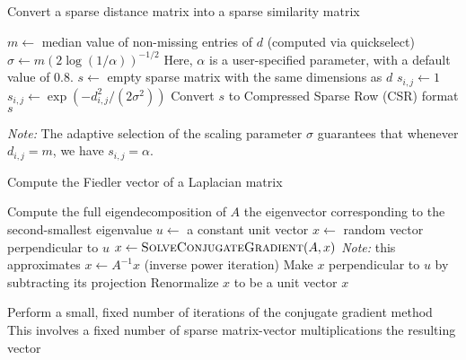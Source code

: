 \documentclass[11pt]{article}
\begin{document}
\begin{algorithm}
\caption{Convert a sparse distance matrix into a sparse similarity matrix}
\begin{algorithmic}
  \State $m \gets $ median value of non-missing entries of $d$ (computed via quickselect)
  \State $\sigma \gets m (2 \log(1/\alpha))^{-1/2}$
  \State Here, $\alpha$ is a user-specified parameter, with a default value of $0.8$.
  \State $s \gets $ empty sparse matrix with the same dimensions as $d$
      \State $s_{i,j} \gets 1$
    \Else
      \State $s_{i,j} \gets \exp(-d_{i,j}^2 / (2 \sigma^2))$
    \EndIf
  \EndFor
  \State Convert $s$ to Compressed Sparse Row (CSR) format
  \State \Return $s$
\EndFunction

\vspace{1em}
\noindent
\emph{Note:} The adaptive selection of the scaling parameter $\sigma$ guarantees that whenever $d_{i,j} = m$, we have $s_{i,j} = \alpha$.
\end{algorithmic}
\end{algorithm}

\begin{algorithm}
\caption{Compute the Fiedler vector of a Laplacian matrix}
\begin{algorithmic}
    \State Compute the full eigendecomposition of $A$
    \State \Return the eigenvector corresponding to the second-smallest eigenvalue
  \Else
    \State $u \gets $ a constant unit vector
    \State $x \gets $ random vector perpendicular to $u$
      \State $x \gets \Call{SolveConjugateGradient}{A, x}$
      \State \emph{Note:} this approximates $x \gets A^{-1} x$ (inverse power iteration)
      \State Make $x$ perpendicular to $u$ by subtracting its projection
      \State Renormalize $x$ to be a unit vector
    \EndFor
    \State \Return $x$
  \EndIf
\EndFunction

\vspace{1em}
  \State Perform a small, fixed number of iterations of the conjugate gradient method
  \State This involves a fixed number of sparse matrix-vector multiplications
  \State \Return the resulting vector
\EndFunction
\end{algorithmic}
\end{algorithm}
\end{document}
